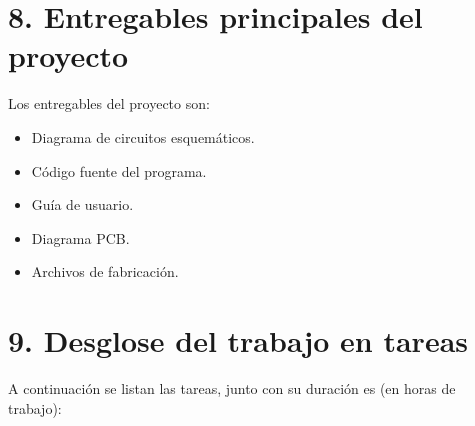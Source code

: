 \documentclass[
11pt, %
codirector, %
]{charter}
\begin{document}
\section{8. Entregables principales del proyecto}
\label{sec:entregables}


Los entregables del proyecto son:

\begin{itemize}
	\item Diagrama de circuitos esquemáticos.
	\item Código fuente del programa.
	\item Guía de usuario.
	\item Diagrama PCB.
	\item Archivos de fabricación.
\end{itemize}


\section{9. Desglose del trabajo en tareas}
\label{sec:wbs}

A continuación se listan las tareas, junto con su duración es (en horas de trabajo):
\end{document}

